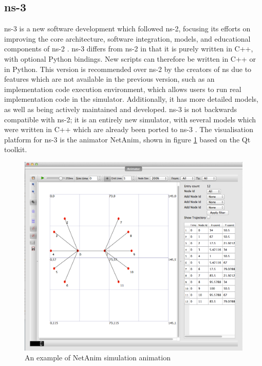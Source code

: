 \subsection{ns-3}
ns-3 is a new software development which followed  ns-2, focusing its efforts on improving the core architecture, software integration, models, and educational components of ns-2 \cite{ns2006}. ns-3 differs from ns-2 in that it is purely written in C++, with optional Python bindings. New scripts can therefore be written in C++ or in Python. This version is recommended over ns-2 by the creators of ns due to features which are not available in the previous version, such as an implementation code execution environment, which allows users to run real implementation code in the simulator. Additionally, it has more detailed models, as well as being actively maintained and developed. ns-3 is not backwards compatible with ns-2; it is an entirely new simulator, with several models which were written in C++ which are already been ported to ns-3 \cite{tommasopecorella2016}. The visualisation platform for ns-3 is the animator NetAnim, shown in figure \ref{netanim} based on the Qt toolkit.

\begin{figure}
\centering	
\includegraphics[scale=0.3]{img/netanim}	
\caption{An example of NetAnim simulation animation}
\label{netanim}
\end{figure}

